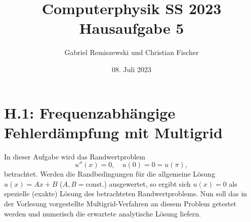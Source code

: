 \documentclass[11pt,a4paper]{article}
\title{\textbf{Computerphysik SS 2023 \\ Hausaufgabe 5}}
\author{Gabriel Remiszewski und Christian Fischer}
\date{08. Juli 2023}
\begin{document}
\maketitle

\section*{H.1: Frequenzabhängige Fehlerdämpfung mit Multigrid}\label{sec:h1}

In dieser Aufgabe wird das Randwertproblem
\begin{equation*}
    u''(x) = 0 , \quad u(0) = 0 = u(\pi) ,
\end{equation*} betrachtet. Werden die Randbedingungen für die allgemeine Lösung $u(x) = Ax + B$ ($A,B = \mathrm{const.}$) ausgewertet, so ergibt sich $u(x) = 0$ als spezielle (exakte) Lösung
des betrachteten Randwertproblems. Nun soll das in der Vorlesung vorgestellte Multigrid-Verfahren an diesem Problem getestet werden und numerisch die erwartete analytische Lösung liefern.\newline
\end{document}

